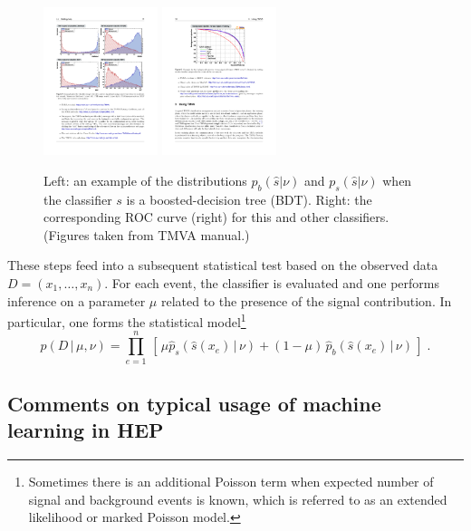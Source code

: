 \documentclass[12pt]{article}
\numberwithin{equation}{section}
\theoremstyle{plain}
\begin{document}
\begin{figure}[htbp]
\begin{center}
 \includegraphics[height=1.7in]{figures/example-TMVA-BDT.pdf}
 \includegraphics[height=1.7in]{figures/example-TMVA-ROC.pdf}
\caption{Left: an example of the distributions $p_b(\hat s|\nu)$ and $p_s(\hat s|\nu)$ when the classifier $s$ is a boosted-decision tree (BDT). Right: the corresponding ROC curve (right) for this and other classifiers. (Figures taken from TMVA manual.)}
\label{fig:tmva}
\end{center}
\end{figure}

These steps feed into a subsequent statistical test based on the observed data
${D=(x_1, \dots, x_n)}$. For each event, the classifier is evaluated and one performs inference on a parameter $\mu$ related to the presence of the signal contribution. In particular, one forms the statistical model\footnote{Sometimes there is an additional Poisson term when expected number of signal and background events is known, which is referred to as an extended likelihood or marked Poisson model.}
\begin{equation}\label{eq:typicalML}
p( D \,|\, \mu, \nu) = \prod_{e=1}^n \, \left[\, \mu \hat{p}_s( \hat s(x_e) \, |\,  \nu)  + (1-\mu)\, \hat{p}_b( \hat s(x_e) \,|\, \nu) \,\right] \; .
\end{equation}

\subsection{Comments on typical usage of machine learning in HEP}
\end{document}
